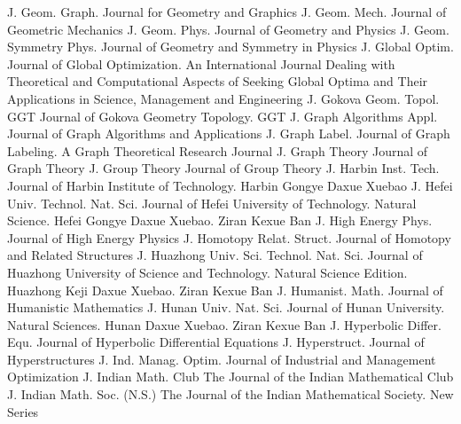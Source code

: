 {J. Geom. Graph.}
{Journal for Geometry and Graphics}
{J. Geom. Mech.}
{Journal of Geometric Mechanics}
{J. Geom. Phys.}
{Journal of Geometry and Physics}
{J. Geom. Symmetry Phys.}
{Journal of Geometry and Symmetry in Physics}
{J. Global Optim.}
{Journal of Global Optimization. An International Journal Dealing with Theoretical and Computational Aspects of Seeking Global Optima and Their Applications in Science, Management and Engineering}
{J. Gokova Geom. Topol. GGT}
{Journal of Gokova Geometry Topology. GGT}
{J. Graph Algorithms Appl.}
{Journal of Graph Algorithms and Applications}
{J. Graph Label.}
{Journal of Graph Labeling. A Graph Theoretical Research Journal}
{J. Graph Theory}
{Journal of Graph Theory}
{J. Group Theory}
{Journal of Group Theory}
{J. Harbin Inst. Tech.}
{Journal of Harbin Institute of Technology. Harbin Gongye Daxue Xuebao}
{J. Hefei Univ. Technol. Nat. Sci.}
{Journal of Hefei University of Technology. Natural Science. Hefei Gongye Daxue Xuebao. Ziran Kexue Ban}
{J. High Energy Phys.}
{Journal of High Energy Physics}
{J. Homotopy Relat. Struct.}
{Journal of Homotopy and Related Structures}
{J. Huazhong Univ. Sci. Technol. Nat. Sci.}
{Journal of Huazhong University of Science and Technology. Natural Science Edition. Huazhong Keji Daxue Xuebao. Ziran Kexue Ban}
{J. Humanist. Math.}
{Journal of Humanistic Mathematics}
{J. Hunan Univ. Nat. Sci.}
{Journal of Hunan University. Natural Sciences. Hunan Daxue Xuebao. Ziran Kexue Ban}
{J. Hyperbolic Differ. Equ.}
{Journal of Hyperbolic Differential Equations}
{J. Hyperstruct.}
{Journal of Hyperstructures}
{J. Ind. Manag. Optim.}
{Journal of Industrial and Management Optimization}
{J. Indian Math. Club}
{The Journal of the Indian Mathematical Club}
{J. Indian Math. Soc. (N.S.)}
{The Journal of the Indian Mathematical Society. New Series}
